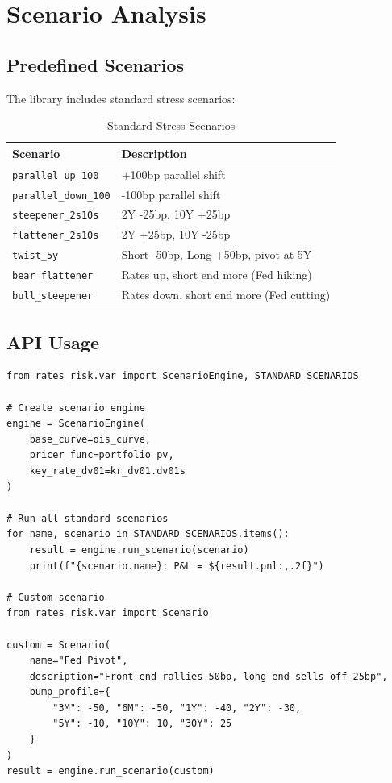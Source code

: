 \documentclass[12pt,a4paper]{report}
\newcommand{\code}[1]{\texttt{#1}}
\begin{document}
\section{Scenario Analysis}

\subsection{Predefined Scenarios}

The library includes standard stress scenarios:

\begin{table}[H]
\centering
\begin{tabular}{@{}lp{8cm}@{}}
\toprule
\textbf{Scenario} & \textbf{Description} \\
\midrule
\code{parallel\_up\_100} & +100bp parallel shift \\
\code{parallel\_down\_100} & -100bp parallel shift \\
\code{steepener\_2s10s} & 2Y -25bp, 10Y +25bp \\
\code{flattener\_2s10s} & 2Y +25bp, 10Y -25bp \\
\code{twist\_5y} & Short -50bp, Long +50bp, pivot at 5Y \\
\code{bear\_flattener} & Rates up, short end more (Fed hiking) \\
\code{bull\_steepener} & Rates down, short end more (Fed cutting) \\
\bottomrule
\end{tabular}
\caption{Standard Stress Scenarios}
\end{table}

\subsection{API Usage}

\begin{lstlisting}
from rates_risk.var import ScenarioEngine, STANDARD_SCENARIOS

# Create scenario engine
engine = ScenarioEngine(
    base_curve=ois_curve,
    pricer_func=portfolio_pv,
    key_rate_dv01=kr_dv01.dv01s
)

# Run all standard scenarios
for name, scenario in STANDARD_SCENARIOS.items():
    result = engine.run_scenario(scenario)
    print(f"{scenario.name}: P&L = ${result.pnl:,.2f}")

# Custom scenario
from rates_risk.var import Scenario

custom = Scenario(
    name="Fed Pivot",
    description="Front-end rallies 50bp, long-end sells off 25bp",
    bump_profile={
        "3M": -50, "6M": -50, "1Y": -40, "2Y": -30,
        "5Y": -10, "10Y": 10, "30Y": 25
    }
)
result = engine.run_scenario(custom)
\end{lstlisting}
\end{document}
